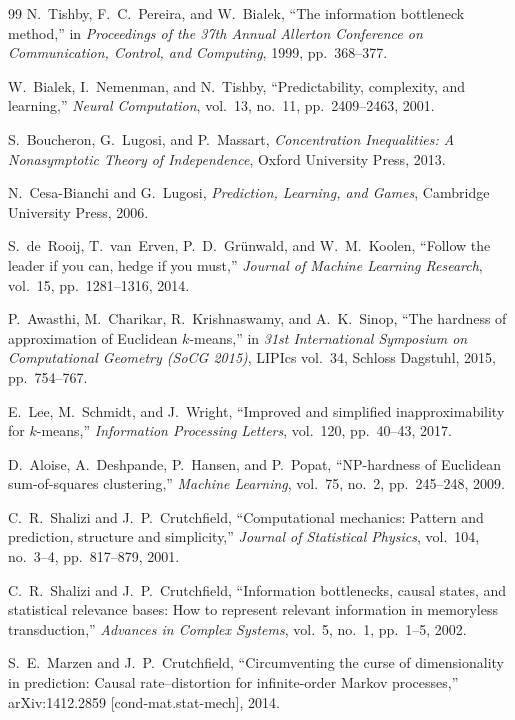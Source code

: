 \documentclass[12pt]{article}
\theoremstyle{definition}
\begin{document}
\begin{thebibliography}{99}
N.~Tishby, F.~C.~Pereira, and W.~Bialek,
``The information bottleneck method,''
in \emph{Proceedings of the 37th Annual Allerton Conference on Communication,
Control, and Computing}, 1999, pp.~368--377.

W.~Bialek, I.~Nemenman, and N.~Tishby,
``Predictability, complexity, and learning,''
\emph{Neural Computation}, vol.~13, no.~11, pp.~2409--2463, 2001.

S.~Boucheron, G.~Lugosi, and P.~Massart,
\emph{Concentration Inequalities: A Nonasymptotic Theory of Independence},
Oxford University Press, 2013.

N.~Cesa-Bianchi and G.~Lugosi,
\emph{Prediction, Learning, and Games},
Cambridge University Press, 2006.

S.~de~Rooij, T.~van~Erven, P.~D.~Gr\"unwald, and W.~M.~Koolen,
``Follow the leader if you can, hedge if you must,''
\emph{Journal of Machine Learning Research},
vol.~15, pp.~1281--1316, 2014.

P.~Awasthi, M.~Charikar, R.~Krishnaswamy, and A.~K.~Sinop,
``The hardness of approximation of Euclidean $k$-means,''
in \emph{31st International Symposium on Computational Geometry (SoCG 2015)},
LIPIcs vol.~34, Schloss Dagstuhl, 2015, pp.~754--767.

E.~Lee, M.~Schmidt, and J.~Wright,
``Improved and simplified inapproximability for $k$-means,''
\emph{Information Processing Letters}, vol.~120, pp.~40--43, 2017.

D.~Aloise, A.~Deshpande, P.~Hansen, and P.~Popat,
``NP-hardness of Euclidean sum-of-squares clustering,''
\emph{Machine Learning}, vol.~75, no.~2, pp.~245--248, 2009.

C.~R.~Shalizi and J.~P.~Crutchfield,
``Computational mechanics: Pattern and prediction, structure and simplicity,''
\emph{Journal of Statistical Physics}, vol.~104, no.~3--4, pp.~817--879, 2001.

C.~R.~Shalizi and J.~P.~Crutchfield,
``Information bottlenecks, causal states, and statistical relevance bases:
How to represent relevant information in memoryless transduction,''
\emph{Advances in Complex Systems}, vol.~5, no.~1, pp.~1--5, 2002.

S.~E.~Marzen and J.~P.~Crutchfield,
``Circumventing the curse of dimensionality in prediction: Causal
rate--distortion for infinite-order Markov processes,''
arXiv:1412.2859 [cond-mat.stat-mech], 2014.


\end{thebibliography}
\end{document}
